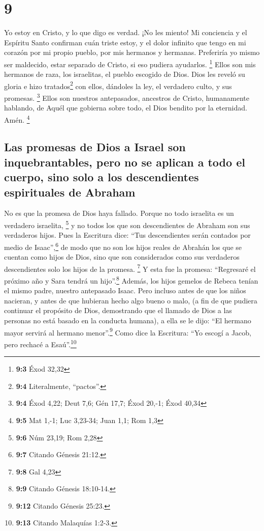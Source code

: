 \hypertarget{section-8}{%
\section{9}\label{section-8}}

 Yo estoy en Cristo, y lo que digo es verdad. ¡No les
miento! Mi conciencia y el Espíritu Santo confirman  cuán
triste estoy, y el dolor infinito que tengo en mi corazón 
por mi propio pueblo, por mis hermanos y hermanas. Preferiría yo mismo
ser maldecido, estar separado de Cristo, si eso pudiera ayudarlos.
\footnote{\textbf{9:3} Éxod 32,32}  Ellos son mis hermanos
de raza, los israelitas, el pueblo escogido de Dios. Dios les reveló su
gloria e hizo tratados\footnote{\textbf{9:4} Literalmente, ``pactos''.}
con ellos, dándoles la ley, el verdadero culto, y sus promesas.
\footnote{\textbf{9:4} Éxod 4,22; Deut 7,6; Gén 17,7; Éxod 20,-1; Éxod
  40,34}  Ellos son nuestros antepasados, ancestros de
Cristo, humanamente hablando, de Aquél que gobierna sobre todo, el Dios
bendito por la eternidad. Amén. \footnote{\textbf{9:5} Mat 1,-1; Luc
  3,23-34; Juan 1,1; Rom 1,3}

\hypertarget{las-promesas-de-dios-a-israel-son-inquebrantables-pero-no-se-aplican-a-todo-el-cuerpo-sino-solo-a-los-descendientes-espirituales-de-abraham}{%
\subsection{Las promesas de Dios a Israel son inquebrantables, pero no
se aplican a todo el cuerpo, sino solo a los descendientes espirituales
de
Abraham}\label{las-promesas-de-dios-a-israel-son-inquebrantables-pero-no-se-aplican-a-todo-el-cuerpo-sino-solo-a-los-descendientes-espirituales-de-abraham}}

 No es que la promesa de Dios haya fallado. Porque no todo
israelita es un verdadero israelita, \footnote{\textbf{9:6} Núm 23,19;
  Rom 2,28}  y no todos los que son descendientes de
Abraham son sus verdaderos hijos. Pues la Escritura dice: ``Tus
descendientes serán contados por medio de Isaac'',\footnote{\textbf{9:7}
  Citando Génesis 21:12.}  de modo que no son los hijos
reales de Abrahán los que se cuentan como hijos de Dios, sino que son
considerados como sus verdaderos descendientes solo los hijos de la
promesa. \footnote{\textbf{9:8} Gal 4,23}  Y esta fue la
promesa: ``Regresaré el próximo año y Sara tendrá un hijo''.\footnote{\textbf{9:9}
  Citando Génesis 18:10-14.}  Además, los hijos gemelos
de Rebeca tenían el mismo padre, nuestro antepasado Isaac.
 Pero incluso antes de que los niños nacieran, y antes de
que hubieran hecho algo bueno o malo, (a fin de que pudiera continuar el
propósito de Dios, demostrando que el llamado de Dios a las personas no
está basado en la conducta humana),  a ella se le dijo:
``El hermano mayor servirá al hermano menor''.\footnote{\textbf{9:12}
  Citando Génesis 25:23.}  Como dice la Escritura: ``Yo
escogí a Jacob, pero rechacé a Esaú''.\footnote{\textbf{9:13} Citando
  Malaquías 1:2-3.}

